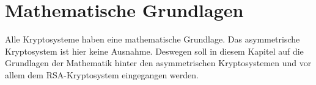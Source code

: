 \author{Autor: An-Nam Pham}
\chapter{Mathematische Grundlagen}


Alle Kryptosysteme haben eine mathematische Grundlage. Das asymmetrische Kryptosystem ist hier keine Ausnahme.
Deswegen soll in diesem Kapitel auf die Grundlagen der Mathematik hinter den asymmetrischen Kryptosystemen und vor allem dem RSA-Kryptosystem eingegangen werden.
